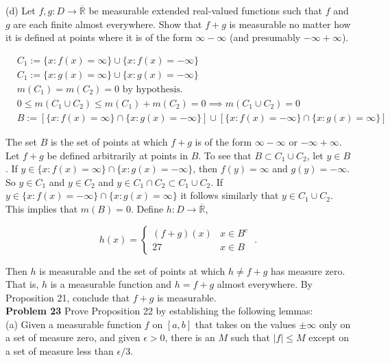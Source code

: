 \documentclass[a4paper]{article}
\begin{document}
(d) Let $f,g : D\rightarrow \overline{\mathbb{R}}$ be measurable extended real-valued functions such that $f$ and $g$ are each finite almost everywhere. Show that $f+g$ is measurable no matter how it is defined at points where it is of the form $\infty - \infty$ (and presumably $-\infty + \infty$).

\begin{align*}
&C_1 := \{x : f(x) = \infty\}\cup \{x : f(x) = -\infty\}\\
&C_1 := \{x : g(x) = \infty\}\cup \{x : g(x) = -\infty\}\\
&m(C_1) = m(C_2) = 0 \text{ by hypothesis.}\\
& 0\leq m(C_1\cup C_2) \leq m(C_1) + m(C_2) = 0 \implies m(C_1\cup C_2) = 0\\
& B:= [\{x : f(x) = \infty\} \cap \{x : g(x) = -\infty\}]\cup [\{x : f(x) = -\infty\} \cap \{x : g(x) = \infty\}]
\end{align*}

The set $B$ is the set of points at which $f+g$ is of the form $\infty - \infty$ or $-\infty + \infty$. Let $f+g$ be defined arbitrarily at points in $B$. To see that $B\subset C_1 \cup C_2$, let $y \in B$. If $y \in  \{x : f(x) = \infty\} \cap \{x : g(x) = -\infty\}$, then $f(y) = \infty$ and $g(y) = -\infty$. So $y \in C_1$ and $y \in C_2$ and $y \in C_1\cap C_2 \subset C_1 \cup C_2$. If $y \in \{x : f(x) = -\infty\} \cap \{x : g(x) = \infty\}$ it follows similarly that $y \in C_1 \cup C_2$. This implies that $m(B) = 0$. Define $h : D \rightarrow \overline{\mathbb{R}}$,

$$h(x) = \begin{cases}
(f+g)(x) & x \in B^c\\
27 & x \in B \end{cases} \;. $$

Then $h$ is measurable and the set of points at which $h \neq f+g$ has measure zero. That is, $h$ is a measurable function and $h = f+g$ almost everywhere. By Proposition 21, conclude that $f+g$ is measurable. \\

{\bf Problem 23} Prove Proposition 22 by establishing the following lemmas:\\

(a) Given a measurable function $f$ on $[a,b]$ that takes on the values $\pm \infty$ only on a set of measure zero, and given $\epsilon > 0$, there is an $M$ such that $|f| \leq M$ except on a set of measure less than $\epsilon / 3$.\\
\end{document}
